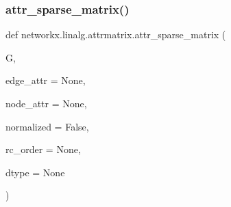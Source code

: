\subsubsection{\texorpdfstring{attr\+\_\+sparse\+\_\+matrix()}{attr\_sparse\_matrix()}}
{\footnotesize\ttfamily def networkx.\+linalg.\+attrmatrix.\+attr\+\_\+sparse\+\_\+matrix (\begin{DoxyParamCaption}\item[{}]{G,  }\item[{}]{edge\+\_\+attr = {\ttfamily None},  }\item[{}]{node\+\_\+attr = {\ttfamily None},  }\item[{}]{normalized = {\ttfamily False},  }\item[{}]{rc\+\_\+order = {\ttfamily None},  }\item[{}]{dtype = {\ttfamily None} }\end{DoxyParamCaption})}


